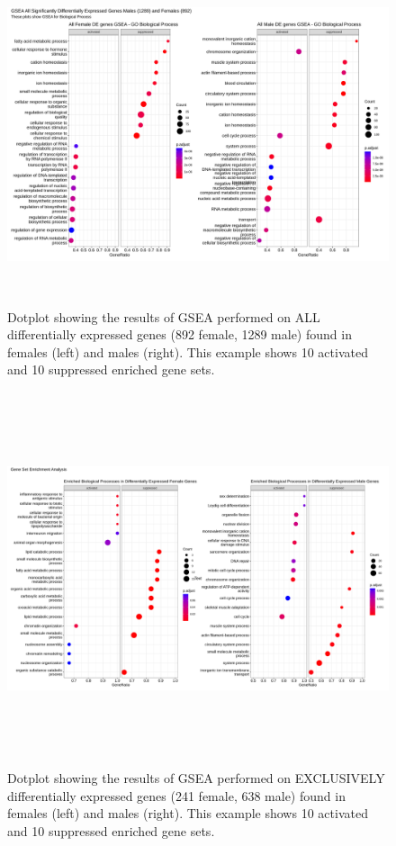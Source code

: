 \documentclass[10pt]{article}
\begin{document}
	\begin{figure}[!h]
		\centering
		\includegraphics[width=17cm, height=10cm]{all_cancersgsea_alldegenes_male_female_bp0.9.png}
		\caption{Dotplot showing the results of GSEA performed on ALL differentially expressed genes (892 female, 1289 male) found in females (left) and males (right). This example shows 10 activated and 10 suppressed enriched gene sets.}
		\label{fig:7}
	\end{figure}
		
	\begin{figure}[!h]
		\centering
		\includegraphics[width=\textwidth, height=11cm]{all_cancersgsea_exclusivedegenes_male_female_bp0.9.png}
		\caption{Dotplot showing the results of GSEA performed on EXCLUSIVELY differentially expressed genes (241 female, 638 male) found in females (left) and males (right). This example shows 10 activated and 10 suppressed enriched gene sets.}
		\label{fig:8}
	\end{figure}
	
\end{document}
